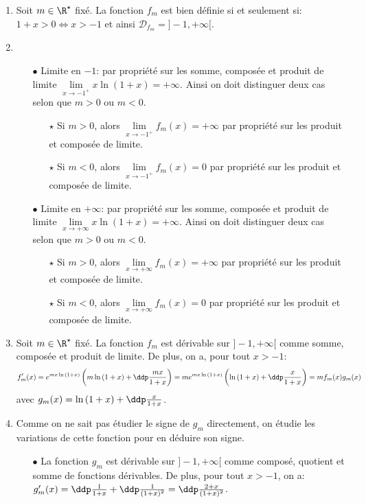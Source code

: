 \begin{correction}   \;
\begin{enumerate}
\item Soit $m\in\R^{\star}$ fix\'e. La fonction $f_m$ est bien d\'efinie si et seulement si: $1+x>0\Leftrightarrow x>-1$ et ainsi $\mathcal{D}_{f_m}=\rbrack -1,+\infty\lbrack$.
\item
\begin{itemize}
\item[$\bullet$] Limite en $-1$: par propri\'et\'e sur les somme, compos\'ee et produit de limite $\lim\limits_{x\to -1^+} x\ln{(1+x)}=+\infty$. Ainsi on doit distinguer deux cas selon que $m>0$ ou $m<0$.
\begin{itemize}
\item[$\star$] Si $m>0$, alors $\lim\limits_{x\to -1^+} f_m(x)=+\infty$ par propri\'et\'e sur les produit et compos\'ee de limite.
\item[$\star$] Si $m<0$, alors $\lim\limits_{x\to -1^+} f_m(x)=0$ par propri\'et\'e sur les produit et compos\'ee de limite.
\end{itemize}
\item[$\bullet$] Limite en $+\infty$: par propri\'et\'e sur les somme, compos\'ee et produit de limite $\lim\limits_{x\to+\infty} x\ln{(1+x)}=+\infty$. Ainsi on doit distinguer deux cas selon que $m>0$ ou $m<0$.
\begin{itemize}
\item[$\star$] Si $m>0$, alors $\lim\limits_{x\to +\infty} f_m(x)=+\infty$ par propri\'et\'e sur les produit et compos\'ee de limite.
\item[$\star$] Si $m<0$, alors $\lim\limits_{x\to +\infty} f_m(x)=0$ par propri\'et\'e sur les produit et compos\'ee de limite.
\end{itemize}
\end{itemize}
\item  Soit $m\in\R^{\star}$ fix\'e. La fonction $f_m$ est d\'erivable sur $\rbrack -1,+\infty\lbrack$ comme somme, compos\'ee et produit de limite. De plus, on a, pour tout $x>-1$: 
$$f_m^{\prime}(x)=e^{mx\ln{(1+x)}} \left(  m\ln{(1+x)} +\ddp\frac{mx}{1+x}  \right)=m e^{mx\ln{(1+x)}} \left(  \ln{(1+x)} +\ddp\frac{x}{1+x}  \right)=mf_m(x)g_m(x) $$
avec $g_m(x)= \ln{(1+x)} +\ddp\frac{x}{1+x}  $.
\item Comme on ne sait pas \'etudier le signe de $g_m$ directement, on \'etudie les variations de cette fonction pour en d\'eduire son signe. 
\begin{itemize}
\item[$\bullet$] La fonction $g_m$ est d\'erivable sur $\rbrack -1,+\infty\lbrack$ comme compos\'e, quotient et somme de fonctions d\'erivables. De plus, pour tout $x>-1$, on a: $g_m^{\prime}(x)=\ddp\frac{1}{1+x} +\ddp\frac{1}{(1+x)^2}=\ddp\frac{2+x}{(1+x)^2} $. 

\end{itemize}
\end{enumerate}
\end{correction}
